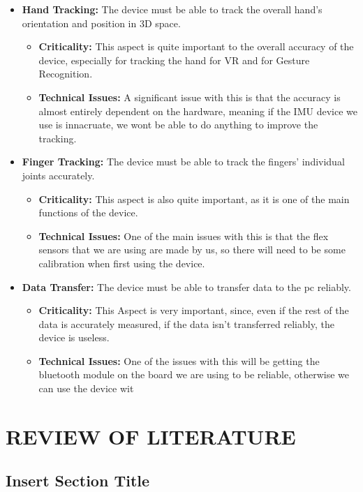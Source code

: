 \documentclass[12pt,a4paper,oneside]{book}
\theoremstyle{plain}
\numberwithin{equation}{chapter}
\begin{document}
\begin{itemize}
    \item{\textbf{Hand Tracking:} The device must be able to track the overall hand's orientation and position in 3D space.}
        \begin{itemize}
            \item{\textbf{Criticality:} This aspect is quite important to the overall accuracy of the device, especially for tracking the hand for VR and for Gesture Recognition.}
            \item{\textbf{Technical Issues:} A significant issue with this is that the accuracy is almost entirely dependent on the hardware, meaning if the IMU device we use is innacruate, we wont be able to do anything to improve the tracking.}
        \end{itemize}
    \item{\textbf{Finger Tracking:} The device must be able to track the fingers' individual joints accurately.}
        \begin{itemize}
            \item{\textbf{Criticality:} This aspect is also quite important, as it is one of the main functions of the device.}
            \item{\textbf{Technical Issues:} One of the main issues with this is that the flex sensors that we are using are made by us, so there will need to be some calibration when first using the device.}
        \end{itemize}
    \item{\textbf{Data Transfer:} The device must be able to transfer data to the pc reliably.}
        \begin{itemize}
            \item{\textbf{Criticality:} This Aspect is very important, since, even if the rest of the data is accurately measured, if the data isn't transferred reliably, the device is useless.}
            \item{\textbf{Technical Issues:} One of the issues with this will be getting the bluetooth module on the board we are using to be reliable, otherwise we can use the device wit}
        \end{itemize}
\end{itemize}

\chapter*{REVIEW OF LITERATURE}
\section{Insert Section Title}\label{Sec3.1}
\end{document}
